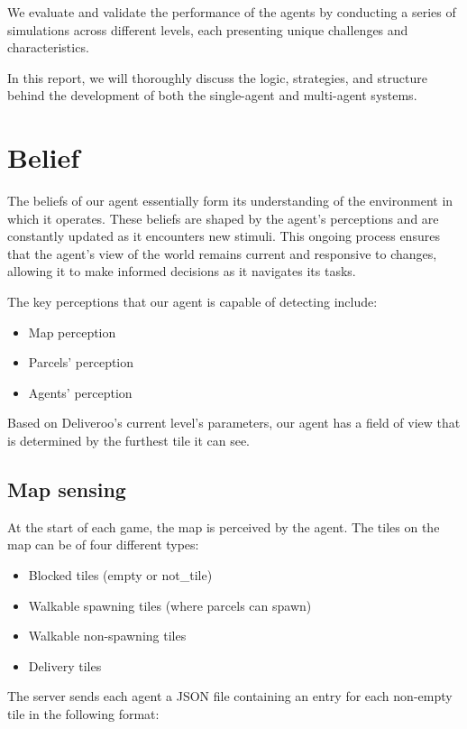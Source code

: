 \documentclass[10pt]{article}
\begin{document}
We evaluate and validate the performance of the agents by conducting a series of simulations across different levels, each presenting unique challenges and characteristics.

In this report, we will thoroughly discuss the logic, strategies, and structure behind the development of both the single-agent and multi-agent systems.


\section{Belief}

The beliefs of our agent essentially form its understanding of the environment in which it operates. These beliefs are shaped by the agent's perceptions and are constantly updated as it encounters new stimuli. This ongoing process ensures that the agent's view of the world remains current and responsive to changes, allowing it to make informed decisions as it navigates its tasks.

The key perceptions that our agent is capable of detecting include:

\begin{itemize}
    \item Map perception
    \item Parcels' perception
    \item Agents' perception
\end{itemize}

Based on Deliveroo's current level's parameters, our agent has a field of view that is determined by the furthest tile it can see.

\subsection{Map sensing}

At the start of each game, the map is perceived by the agent. The tiles on the map can be of four different types:

\begin{itemize}
    \item Blocked tiles (empty or not\_tile)
    \item Walkable spawning tiles (where parcels can spawn)
    \item Walkable non-spawning tiles
    \item Delivery tiles
\end{itemize}

The server sends each agent a JSON file containing an entry for each non-empty tile in the following format:
\end{document}
